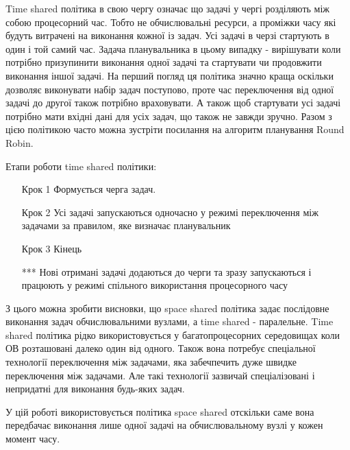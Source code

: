 Time shared політика в свою чергу означає що задачі у чергі розділяють між собою процесорний час. Тобто не обчислювальні ресурси, а проміжки часу які будуть витрачені на виконання кожної із задач. Усі задачі в черзі стартують в один і той самий час. Задача планувальника в цьому випадку - вирішувати коли потрібно призупинити виконання одної задачі та стартувати чи продовжити виконання іншої задачі. На перший погляд ця політика значно краща оскільки дозволяє виконувати набір задач поступово, проте час переключення від одної задачі до другої також потрібно враховувати. А також щоб стартувати усі задачі потрібно мати вхідні дані для усіх задач, що також не завжди зручно. Разом з цією політикою часто можна зустріти посилання на алгоритм планування Round Robin.

Етапи роботи time shared політики:
\begin{itemize}
	\item[Крок 1] Формується черга задач.
	\item[Крок 2] Усі задачі запускаються одночасно у режимі переключення між задачами за правилом, яке визначає планувальник
	\item[Крок 3] Кінець
	\item[***] Нові отримані задачі додаються до черги та зразу запускаються і працюють у режимі спільного використання процесорного часу
\end{itemize}

З цього можна зробити висновки, що space shared політика задає послідовне виконання задач обчислювальними вузлами, а time shared - паралельне. Time shared політика рідко використовується у багатопроцесорних середовищах коли ОВ розташовані далеко один від одного. Також вона потребує спеціальної технології переключення між задачами, яка забечпечить дуже швидке переключення між задачами. Але такі технології зазвичай спеціалізовані і непридатні для виконання будь-яких задач.

У цій роботі використовується політика space shared отскільки саме вона передбачає виконання лише одної задачі на обчислювальному вузлі у кожен момент часу.

